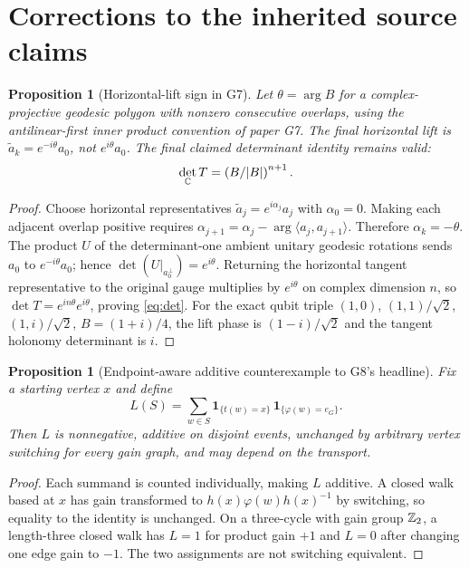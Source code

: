 \documentclass[11pt]{article}
\newtheorem{proposition}[theorem]{Proposition}
\begin{document}
\section{Corrections to the inherited source claims}
\begin{proposition}[Horizontal-lift sign in G7]\label{prop:sign}
Let $\theta=\arg B$ for a complex-projective geodesic polygon with nonzero consecutive overlaps, using the antilinear-first inner product convention of paper G7. The final horizontal lift is $\widetilde a_k=e^{-i\theta}a_0$, not $e^{i\theta}a_0$. The final claimed determinant identity remains valid:
\begin{equation}\label{eq:det}
 \det_{\mathbb C} T=\left(B/|B|\right)^{n+1}.
\end{equation}
\end{proposition}
\begin{proof}
Choose horizontal representatives $\widetilde a_j=e^{i\alpha_j}a_j$ with $\alpha_0=0$. Making each adjacent overlap positive requires $\alpha_{j+1}=\alpha_j-\arg\langle a_j,a_{j+1}\rangle$. Therefore $\alpha_k=-\theta$. The product $U$ of the determinant-one ambient unitary geodesic rotations sends $a_0$ to $e^{-i\theta}a_0$; hence $\det(U|_{a_0^\perp})=e^{i\theta}$. Returning the horizontal tangent representative to the original gauge multiplies by $e^{i\theta}$ on complex dimension $n$, so $\det T=e^{in\theta}e^{i\theta}$, proving \eqref{eq:det}. For the exact qubit triple $(1,0)$, $(1,1)/\sqrt2$, $(1,i)/\sqrt2$, $B=(1+i)/4$, the lift phase is $(1-i)/\sqrt2$ and the tangent holonomy determinant is $i$.
\end{proof}
\begin{proposition}[Endpoint-aware additive counterexample to G8's headline]\label{prop:add}
Fix a starting vertex $x$ and define
\[
 L(S)=\sum_{w\in S}\mathbf1_{\{t(w)=x\}}\,\mathbf1_{\{\varphi(w)=e_G\}}.
\]
Then $L$ is nonnegative, additive on disjoint events, unchanged by arbitrary vertex switching for every gain graph, and may depend on the transport.
\end{proposition}
\begin{proof}
Each summand is counted individually, making $L$ additive. A closed walk based at $x$ has gain transformed to $h(x)\varphi(w)h(x)^{-1}$ by switching, so equality to the identity is unchanged. On a three-cycle with gain group $\mathbb Z_2$, a length-three closed walk has $L=1$ for product gain $+1$ and $L=0$ after changing one edge gain to $-1$. The two assignments are not switching equivalent.
\end{proof}
\end{document}
